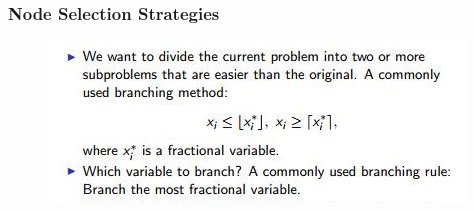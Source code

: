 \documentclass{beamer}
\begin{document}
	
	\begin{frame}
		\frametitle{Node Selection Strategies}
		\large
		\begin{figure}
			\centering
			\includegraphics[width=1.1\linewidth]{NodeSelection1A}
		\end{figure}
	\end{frame}
	
\end{document}
